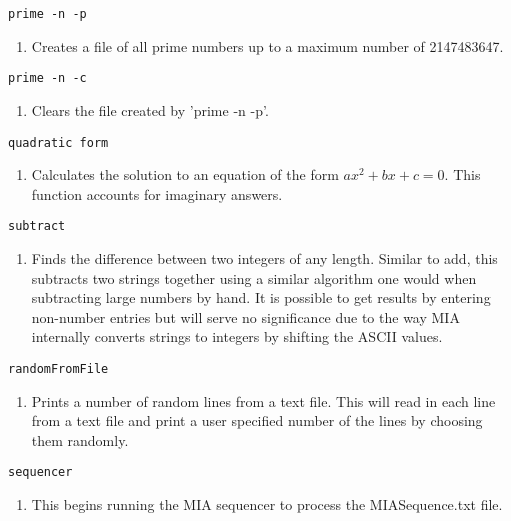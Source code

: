 \begin{lstlisting} 
prime -n -p   
\end{lstlisting}
\begin{enumerate}
	\item[] Creates a file of all prime numbers up to a maximum number of 2147483647.
\end{enumerate}

\begin{lstlisting} 
prime -n -c   
\end{lstlisting}
\begin{enumerate}
	\item[] Clears the file created by 'prime -n -p'.
\end{enumerate}

\begin{lstlisting} 
quadratic form
\end{lstlisting}
\begin{enumerate}
	\item[] Calculates the solution to an equation of the form $ax^2+bx+c=0$. This function accounts for imaginary answers.
\end{enumerate}

\begin{lstlisting} 
subtract   
\end{lstlisting}
\begin{enumerate}
	\item[] Finds the difference between two integers of any length. Similar to add, this subtracts two strings together using a similar algorithm one would when subtracting large numbers by hand. It is possible to get results by entering non-number entries but will serve no significance due to the way MIA internally converts strings to integers by shifting the ASCII values.
\end{enumerate}

\begin{lstlisting} 
randomFromFile
\end{lstlisting}
\begin{enumerate}
	\item[]  Prints a number of random lines from a text file. This will read in each line from a text file and print a user specified number of the lines by choosing them randomly.
\end{enumerate}

\begin{lstlisting} 
sequencer
\end{lstlisting}
\begin{enumerate}
	\item[] This begins running the MIA sequencer to process the MIASequence.txt file. 
\end{enumerate}

